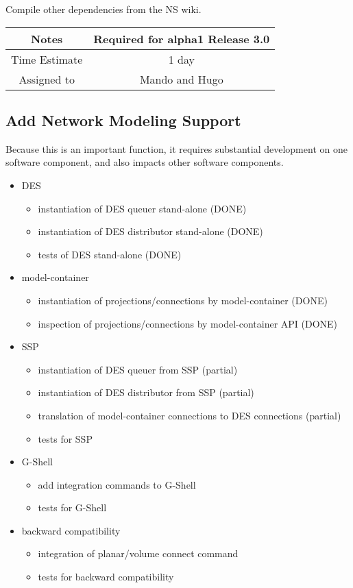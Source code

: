 \documentclass[12pt]{article}
\begin{document}
Compile other dependencies from the NS wiki.

{
  \vspace{5mm}
  \centering
  \begin{tabular}{|c|c|}
    \hline
    Notes
    & Required for alpha1 Release 3.0 \\
    \hline
    Time Estimate
    & 1 day \\
    \hline
    Assigned to
    & Mando and Hugo \\
    \hline
  \end{tabular}
}


\subsection{Add Network Modeling Support}

Because this is an important function, it requires substantial
development on one software component, and also impacts other software
components.

\begin{itemize}
\item DES
  \begin{itemize}
  \item instantiation of DES queuer stand-alone (DONE)
  \item instantiation of DES distributor stand-alone (DONE)
  \item tests of DES stand-alone (DONE)
  \end{itemize}
\item model-container
  \begin{itemize}
  \item instantiation of projections/connections by model-container (DONE)
  \item inspection of projections/connections by model-container API (DONE)
  \end{itemize}
\item SSP
  \begin{itemize}
  \item instantiation of DES queuer from SSP (partial)
  \item instantiation of DES distributor from SSP (partial)
  \item translation of model-container connections to DES connections (partial)
  \item tests for SSP
  \end{itemize}
\item G-Shell
  \begin{itemize}
  \item add integration commands to G-Shell
  \item tests for G-Shell
  \end{itemize}
\item backward compatibility
  \begin{itemize}
  \item integration of planar/volume connect command
  \item tests for backward compatibility
  \end{itemize}
\end{itemize}
\end{document}
